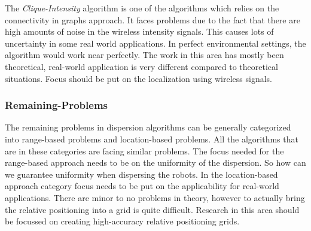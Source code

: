 The \emph{Clique-Intensity} algorithm is one of the algorithms which relies on the connectivity in graphs approach.
It faces problems due to the fact that there are high amounts of noise in the wireless intensity signals. This causes lots of uncertainty in some real world applications.
In perfect environmental settings, the algorithm would work near perfectly.
The work in this area has mostly been theoretical, real-world application is very different compared to theoretical situations.
Focus should be put on the localization using wireless signals.\\

\subsubsection{Remaining-Problems}
The remaining problems in dispersion algorithms can be generally categorized into range-based problems and location-based problems.
All the algorithms that are in these categories are facing similar problems.
The focus needed for the range-based approach needs to be on the uniformity of the dispersion. So how can we guarantee uniformity when dispersing the robots.
In the location-based approach category focus needs to be put on the applicability for real-world applications.
There are minor to no problems in theory, however to actually bring the relative positioning into a grid is quite difficult.
Research in this area should be focussed on creating high-accuracy relative positioning grids.
